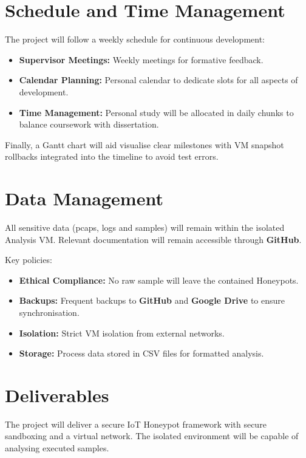 \documentclass[a4paper,12pt,oneside]{book}			%
\begin{document}
\section{Schedule and Time Management}\label{sec:time management}
The project will follow a weekly schedule for continuous development:
\begin{itemize}
\item\textbf{Supervisor Meetings:} Weekly meetings for formative feedback.
\item\textbf{Calendar Planning:} Personal calendar to dedicate slots for all aspects of development.
\item\textbf{Time Management:} Personal study will be allocated in daily chunks to balance coursework with dissertation.
\end{itemize}
Finally, a Gantt chart will aid visualise clear milestones with VM snapshot rollbacks integrated into the timeline to avoid test errors. 



\section{Data Management}\label{sec:data management}

All sensitive data (pcaps, logs and samples) will remain within the isolated Analysis VM. Relevant documentation will remain accessible through \textbf{GitHub}. 

Key policies:
\begin{itemize}
	\item\textbf{Ethical Compliance:} No raw sample will leave the contained Honeypots.
	\item\textbf{Backups:} Frequent backups to \textbf{GitHub} and \textbf{Google Drive} to ensure synchronisation. 
	\item\textbf{Isolation:} Strict VM isolation from external networks.
	\item\textbf{Storage:} Process data stored in CSV files for formatted analysis.
\end{itemize}



\section{Deliverables}\label{sec: deliverables}

The project will deliver a secure IoT Honeypot framework with secure sandboxing and a virtual network. The isolated environment will be capable of analysing executed samples.
\end{document}
